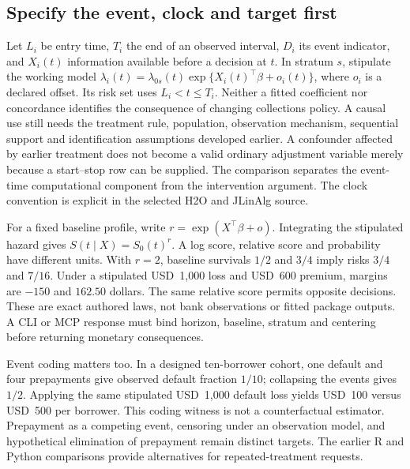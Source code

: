 \subsection{Specify the event, clock and target first}
Let $L_i$ be entry time, $T_i$ the end of an observed interval, $D_i$ its
event indicator, and $X_i(t)$ information available before a decision at
$t$. In stratum $s$, stipulate the working model
$\lambda_i(t)=\lambda_{0s}(t)\exp\{X_i(t)^\top\beta+o_i(t)\}$, where
$o_i$ is a declared offset. Its risk set uses $L_i<t\leq T_i$. Neither
a fitted coefficient nor concordance identifies the consequence of changing
collections policy. A causal use still needs the treatment rule, population,
observation mechanism, sequential support and identification assumptions
developed earlier. A confounder affected by earlier treatment does not become
a valid ordinary adjustment variable merely because a start--stop row can
be supplied. The comparison separates the event-time computational component
from the intervention argument. The clock convention is explicit in the
selected H2O and JLinAlg source. \citep{exec24_longjava_h2o,exec24_longjava_jlinalg}

For a fixed baseline profile, write $r=\exp(X^\top\beta+o)$.
Integrating the stipulated hazard gives $S(t\mid X)=S_0(t)^r$.
A log score, relative score and probability have different units. With
$r=2$, baseline survivals $1/2$ and $3/4$ imply risks $3/4$ and $7/16$.
Under a stipulated USD~1,000 loss and USD~600 premium, margins are
$-150$ and $162.50$ dollars. The same relative score permits opposite
decisions. These are exact authored laws, not bank observations or fitted
package outputs. A CLI or MCP response must bind horizon, baseline, stratum
and centering before returning monetary consequences.
\citep{exec24_longjava_reference}

Event coding matters too. In a designed ten-borrower cohort, one default and
four prepayments give observed default fraction $1/10$; collapsing the events
gives $1/2$. Applying the same stipulated USD~1,000 default loss yields
USD~100 versus USD~500 per borrower. This coding witness is not a
counterfactual estimator. Prepayment as a competing event, censoring under an
observation model, and hypothetical elimination of prepayment remain distinct
targets. The earlier R and Python comparisons provide alternatives for
repeated-treatment requests. \citep{exec24_longjava_reference}

